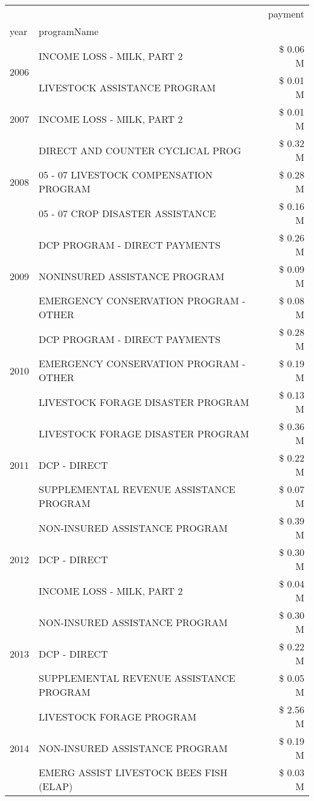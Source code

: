 \begin{tabular}{llr}
\toprule
 &  & payment \\
year & programName &  \\
\midrule
\multirow[t]{2}{*}{2006} & INCOME LOSS - MILK, PART 2 & \$ 0.06 M \\
 & LIVESTOCK ASSISTANCE PROGRAM & \$ 0.01 M \\
\cline{1-3}
2007 & INCOME LOSS - MILK, PART 2 & \$ 0.01 M \\
\cline{1-3}
\multirow[t]{3}{*}{2008} & DIRECT AND COUNTER CYCLICAL PROG & \$ 0.32 M \\
 & 05 - 07 LIVESTOCK COMPENSATION PROGRAM & \$ 0.28 M \\
 & 05 - 07 CROP DISASTER ASSISTANCE & \$ 0.16 M \\
\cline{1-3}
\multirow[t]{3}{*}{2009} & DCP PROGRAM - DIRECT PAYMENTS & \$ 0.26 M \\
 & NONINSURED ASSISTANCE PROGRAM & \$ 0.09 M \\
 & EMERGENCY CONSERVATION PROGRAM - OTHER & \$ 0.08 M \\
\cline{1-3}
\multirow[t]{3}{*}{2010} & DCP PROGRAM - DIRECT PAYMENTS & \$ 0.28 M \\
 & EMERGENCY CONSERVATION PROGRAM - OTHER & \$ 0.19 M \\
 & LIVESTOCK FORAGE DISASTER  PROGRAM & \$ 0.13 M \\
\cline{1-3}
\multirow[t]{3}{*}{2011} & LIVESTOCK FORAGE DISASTER PROGRAM & \$ 0.36 M \\
 & DCP - DIRECT & \$ 0.22 M \\
 & SUPPLEMENTAL REVENUE ASSISTANCE PROGRAM & \$ 0.07 M \\
\cline{1-3}
\multirow[t]{3}{*}{2012} & NON-INSURED ASSISTANCE PROGRAM & \$ 0.39 M \\
 & DCP - DIRECT & \$ 0.30 M \\
 & INCOME LOSS - MILK, PART 2 & \$ 0.04 M \\
\cline{1-3}
\multirow[t]{3}{*}{2013} & NON-INSURED ASSISTANCE PROGRAM & \$ 0.30 M \\
 & DCP - DIRECT & \$ 0.22 M \\
 & SUPPLEMENTAL REVENUE ASSISTANCE PROGRAM & \$ 0.05 M \\
\cline{1-3}
\multirow[t]{3}{*}{2014} & LIVESTOCK FORAGE PROGRAM & \$ 2.56 M \\
 & NON-INSURED ASSISTANCE PROGRAM & \$ 0.19 M \\
 & EMERG ASSIST LIVESTOCK BEES FISH (ELAP) & \$ 0.03 M \\

\end{tabular}
